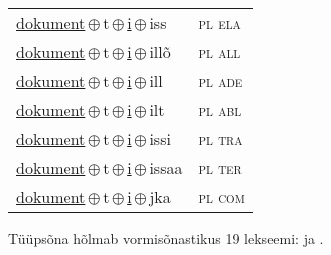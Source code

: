 \begin{minipage}{\textwidth}
\begin{sideways}
\begin{tabular}{l l}
\underline{dokument}\,$\oplus$\,t\,$\oplus$\,\underline{i}\,$\oplus$\,iss & \textsc{ pl ela } \\
\underline{dokument}\,$\oplus$\,t\,$\oplus$\,\underline{i}\,$\oplus$\,illõ & \textsc{ pl all } \\
\underline{dokument}\,$\oplus$\,t\,$\oplus$\,\underline{i}\,$\oplus$\,ill & \textsc{ pl ade } \\
\underline{dokument}\,$\oplus$\,t\,$\oplus$\,\underline{i}\,$\oplus$\,ilt & \textsc{ pl abl } \\
\underline{dokument}\,$\oplus$\,t\,$\oplus$\,\underline{i}\,$\oplus$\,issi & \textsc{ pl tra } \\
\underline{dokument}\,$\oplus$\,t\,$\oplus$\,\underline{i}\,$\oplus$\,issaa & \textsc{ pl ter } \\
\underline{dokument}\,$\oplus$\,t\,$\oplus$\,\underline{i}\,$\oplus$\,jka & \textsc{ pl com } \\
\end{tabular}
\end{sideways}
\label{tab:tüüpsõnamall-dokumentti}

\end{minipage}

 
\vspace{1em}
\noindent Tüüpsõna hõlmab vormisõnastikus 19 lekseemi:  ja .
